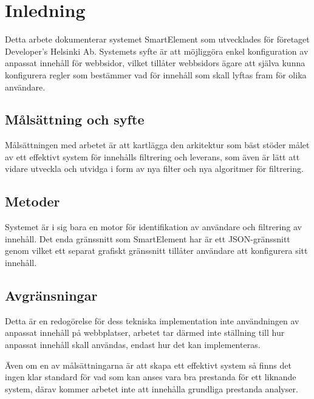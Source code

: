 \section{Inledning}

Detta arbete dokumenterar systemet SmartElement som utvecklades för företaget Developer’s Helsinki Ab. Systemets syfte är att möjliggöra enkel konfiguration av anpassat innehåll för webbsidor, vilket tillåter webbsidors ägare att själva kunna konfigurera regler som bestämmer vad för innehåll som skall lyftas fram för olika användare.

\subsection{Målsättning och syfte}

Målsättningen med arbetet är att kartlägga den arkitektur som bäst stöder målet av ett effektivt system för innehålls filtrering och leverans, som även är lätt att vidare utveckla och utvidga i form av nya filter och nya algoritmer för filtrering.



\subsection{Metoder}

Systemet är i sig bara en motor för identifikation av användare och filtrering av innehåll. Det enda gränssnitt som SmartElement har är ett JSON-gränssnitt genom vilket ett separat grafiskt gränssnitt tillåter användare att konfigurera sitt innehåll.

\subsection{Avgränsningar}

Detta är en redogörelse för dess tekniska implementation inte användningen av anpassat innehåll på webbplatser, arbetet tar därmed inte ställning till hur anpassat innehåll skall användas, endast hur det kan implementeras.

Även om en av målsättningarna är att skapa ett effektivt system så finns det ingen klar standard för vad som kan anses vara bra prestanda för ett liknande system, därav kommer arbetet inte att innehålla grundliga prestanda analyser.

